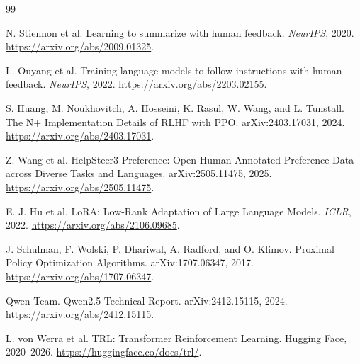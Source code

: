 \documentclass[10pt,twocolumn]{article}
\begin{document}
\balance
\begin{thebibliography}{99}

N. Stiennon et al.
\newblock Learning to summarize with human feedback.
\newblock \emph{NeurIPS}, 2020.
\newblock \url{https://arxiv.org/abs/2009.01325}.

L. Ouyang et al.
\newblock Training language models to follow instructions with human feedback.
\newblock \emph{NeurIPS}, 2022.
\newblock \url{https://arxiv.org/abs/2203.02155}.

S. Huang, M. Noukhovitch, A. Hosseini, K. Rasul, W. Wang, and L. Tunstall.
\newblock The N+ Implementation Details of RLHF with PPO.
\newblock arXiv:2403.17031, 2024.
\newblock \url{https://arxiv.org/abs/2403.17031}.

Z. Wang et al.
\newblock HelpSteer3-Preference: Open Human-Annotated Preference Data across
Diverse Tasks and Languages.
\newblock arXiv:2505.11475, 2025.
\newblock \url{https://arxiv.org/abs/2505.11475}.

E. J. Hu et al.
\newblock LoRA: Low-Rank Adaptation of Large Language Models.
\newblock \emph{ICLR}, 2022.
\newblock \url{https://arxiv.org/abs/2106.09685}.

J. Schulman, F. Wolski, P. Dhariwal, A. Radford, and O. Klimov.
\newblock Proximal Policy Optimization Algorithms.
\newblock arXiv:1707.06347, 2017.
\newblock \url{https://arxiv.org/abs/1707.06347}.

Qwen Team.
\newblock Qwen2.5 Technical Report.
\newblock arXiv:2412.15115, 2024.
\newblock \url{https://arxiv.org/abs/2412.15115}.

L. von Werra et al.
\newblock TRL: Transformer Reinforcement Learning.
\newblock Hugging Face, 2020--2026.
\newblock \url{https://huggingface.co/docs/trl/}.

\end{thebibliography}
\end{document}
